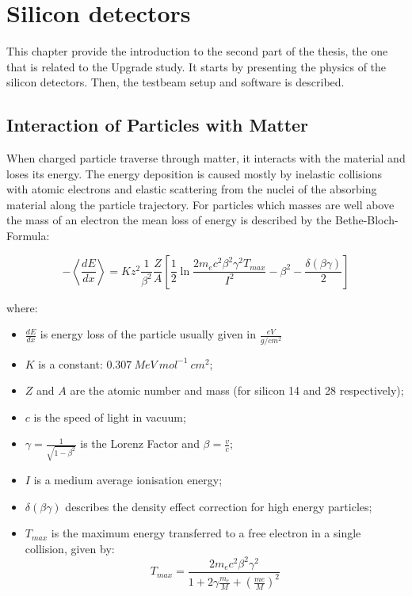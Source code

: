 \chapter{Silicon detectors}


This chapter provide the introduction to the second part of the thesis, the one that is related to the Upgrade study. It starts by presenting the physics of the silicon detectors. Then, the testbeam setup and software is described.  

\section{Interaction of Particles with Matter}
\label{sec:Interaction}
When charged particle traverse through matter, it interacts with the material and loses its energy. The energy deposition is caused mostly by inelastic collisions with atomic electrons and elastic scattering from the nuclei of the absorbing material along the particle trajectory. For particles which masses are well above the mass of an electron the mean loss of energy is described by the Bethe-Bloch-Formula: 

\begin{equation}
\label{eq:Bethe_bloh}
  -\left< \frac{dE}{dx} \right> = K z^2 \frac{1}{\beta^2} \frac{Z}{A} 
  \left[ \frac{1}{2} \ln \frac{2m_e c^2 \beta^2 \gamma^2 T_{max}}{I^2} - \beta^2 - \frac{\delta(\beta \gamma)}{2}
  \right]  
\end{equation}

where: 
\begin{itemize}
    \item $\frac{dE}{dx}$ is energy loss of the particle usually given in $\frac{eV}{g/cm^{2}}$
    \item $K$ is a constant: $0.307~ MeV~ mol^{-1}~ cm^2$;
    \item $Z$ and $A$ are the atomic number and mass (for silicon 14 and 28 respectively);
    \item $c$ is the speed of light in vacuum;
    \item $\gamma = \frac{1}{\sqrt{1-\beta^2}}$ is the Lorenz Factor and $\beta = \frac{v}{c}$;
    \item $I$ is a medium average ionisation energy;
    \item $\delta(\beta \gamma)$ describes the density effect correction for high energy particles; 
    \item $T_{max}$ is the maximum energy transferred to a free electron in a single collision, given by:
    \begin{equation}
        T_{max} = \frac{2m_e c^2 \beta^2 \gamma^2}{1+2\gamma \frac{m_e}{M}+ (\frac{me}{M})^2}
    \end{equation}
\end{itemize}

